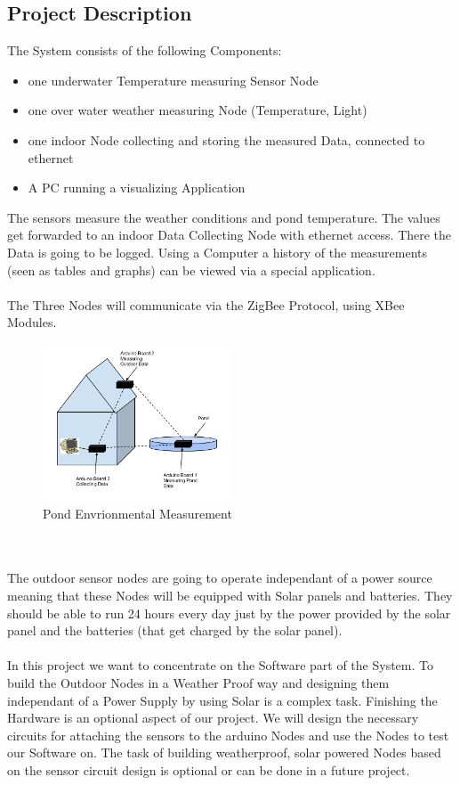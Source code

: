 \documentclass[
	11pt,
	a4paper
]{article}%
\begin{document}
\subsection{Project Description}
The System consists of the following Components:
\begin{itemize}
\item one underwater Temperature measuring Sensor Node
\item one over water weather measuring Node (Temperature, Light)
\item one indoor Node collecting and storing the measured Data, connected to ethernet
\item A PC running a visualizing Application
\end{itemize}
The sensors measure the weather conditions and pond temperature. The values get forwarded to an indoor Data Collecting Node with ethernet access. There the Data is going to be logged. Using a Computer a history of the measurements (seen as tables and graphs) can be viewed via a special application.
\\\\
The Three Nodes will communicate via the ZigBee Protocol, using XBee Modules.
\begin{figure}[h!]
  \caption{Pond Envrionmental Measurement}
  \centering
    \includegraphics[width=0.50\textwidth]{../Images/ssns_project.png}
\end{figure}
\\\\
The outdoor sensor nodes are going to operate independant of a power source meaning that these Nodes will be equipped with Solar panels and batteries. They should be able to run 24 hours every day just by the power provided by the solar panel and the batteries (that get charged by the solar panel).
\\\\
In this project we want to concentrate on the Software part of the System. To build the Outdoor Nodes in a Weather Proof way and designing them independant of a Power Supply by using Solar is a complex task. Finishing the Hardware is an optional aspect of our project. We will design the necessary circuits for attaching the sensors to the arduino Nodes and use the Nodes to test our Software on. The task of building weatherproof, solar powered Nodes based on the sensor circuit design is optional or can be done in a future project.
\end{document}
